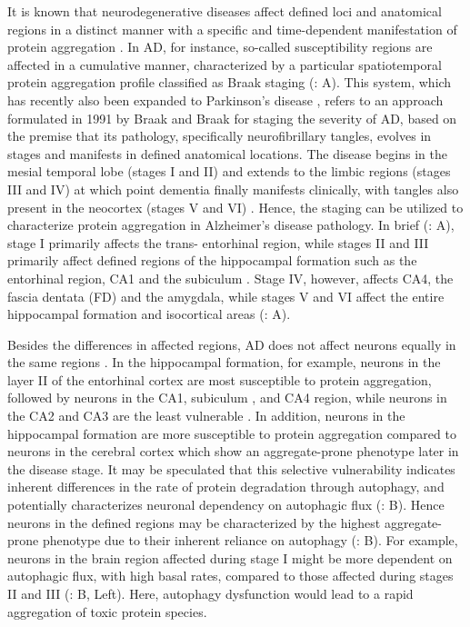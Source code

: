 It is known that neurodegenerative diseases affect defined loci and anatomical regions in a distinct manner with a specific and time-dependent manifestation of protein aggregation \citep{Wang2010a,Wang2010b}. In AD, for instance, so-called susceptibility regions are affected in a cumulative manner, characterized by a particular spatiotemporal protein aggregation profile classified as Braak staging (: A). This system, which has recently also been expanded to Parkinson’s disease \citep{Braak2004}, refers to an approach formulated in 1991 by Braak and Braak for staging the severity of AD, based on the premise that its pathology, specifically neurofibrillary tangles, evolves in stages and manifests in defined anatomical locations. The disease begins in the mesial temporal lobe (stages I and II) and extends to the limbic regions (stages III and IV) at which point dementia finally manifests clinically, with tangles also present in the neocortex (stages V and VI) \citep{Braak1991}. Hence, the staging can be utilized to characterize protein aggregation in Alzheimer’s disease pathology. In brief (: A), stage I primarily affects the trans- entorhinal region, while stages II and III primarily affect defined regions of the hippocampal formation such as the entorhinal region, CA1 and the subiculum \citep{Braak1991,Braak2012}. Stage IV, however, affects CA4, the fascia dentata (FD) and the amygdala, while stages V and VI affect the entire hippocampal formation and isocortical areas \citep{Braak1991} (: A). 

Besides the differences in affected regions, AD does not affect neurons equally in the same regions \citep{Wang2010a,Wang2010b}. In the hippocampal formation, for example, neurons in the layer II of the entorhinal cortex are most susceptible to protein aggregation, followed by neurons in the CA1, subiculum \citep{Wang2010a,Wang2010b}, and CA4 region, while neurons in the CA2 and CA3 are the least vulnerable \citep{Schonheit2004,Wang2010a,Wang2010b}. In addition, neurons in the hippocampal formation are more susceptible to protein aggregation compared to neurons in the cerebral cortex which show an aggregate-prone phenotype later in the disease stage. It may be speculated that this selective vulnerability indicates inherent differences in the rate of protein degradation through autophagy, and potentially characterizes neuronal dependency on autophagic flux (: B). Hence neurons in the defined regions may be characterized by the highest aggregate-prone phenotype due to their inherent reliance on autophagy (: B). For example, neurons in the brain region affected during stage I might be more dependent on autophagic flux, with high basal rates, compared to those affected during stages II and III (: B, Left). Here, autophagy dysfunction would lead to a rapid aggregation of toxic protein species. 

